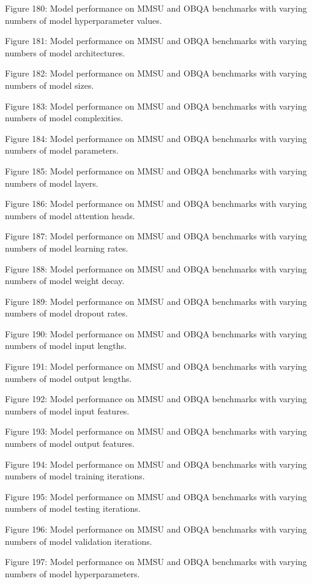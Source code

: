         Figure 180: Model performance on MMSU and OBQA benchmarks with varying numbers of model hyperparameter values.

        Figure 181: Model performance on MMSU and OBQA benchmarks with varying numbers of model architectures.

        Figure 182: Model performance on MMSU and OBQA benchmarks with varying numbers of model sizes.

        Figure 183: Model performance on MMSU and OBQA benchmarks with varying numbers of model complexities.

        Figure 184: Model performance on MMSU and OBQA benchmarks with varying numbers of model parameters.

        Figure 185: Model performance on MMSU and OBQA benchmarks with varying numbers of model layers.

        Figure 186: Model performance on MMSU and OBQA benchmarks with varying numbers of model attention heads.

        Figure 187: Model performance on MMSU and OBQA benchmarks with varying numbers of model learning rates.

        Figure 188: Model performance on MMSU and OBQA benchmarks with varying numbers of model weight decay.

        Figure 189: Model performance on MMSU and OBQA benchmarks with varying numbers of model dropout rates.

        Figure 190: Model performance on MMSU and OBQA benchmarks with varying numbers of model input lengths.

        Figure 191: Model performance on MMSU and OBQA benchmarks with varying numbers of model output lengths.

        Figure 192: Model performance on MMSU and OBQA benchmarks with varying numbers of model input features.

        Figure 193: Model performance on MMSU and OBQA benchmarks with varying numbers of model output features.

        Figure 194: Model performance on MMSU and OBQA benchmarks with varying numbers of model training iterations.

        Figure 195: Model performance on MMSU and OBQA benchmarks with varying numbers of model testing iterations.

        Figure 196: Model performance on MMSU and OBQA benchmarks with varying numbers of model validation iterations.

        Figure 197: Model performance on MMSU and OBQA benchmarks with varying numbers of model hyperparameters.

